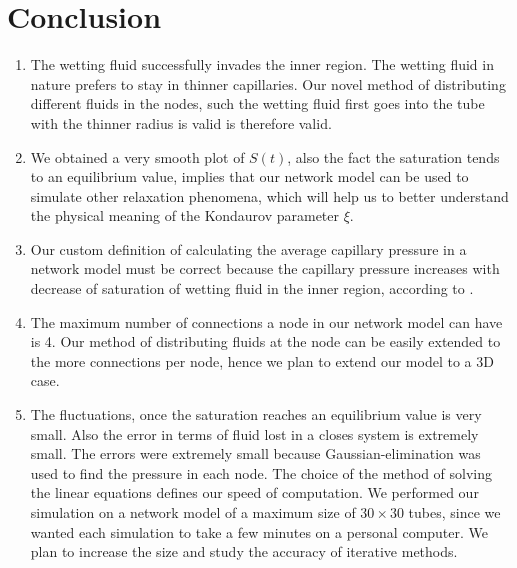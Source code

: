 \documentclass[
	12pt
] {article}
\begin{document}
\section{Conclusion}
	\begin{enumerate}
		\item The wetting fluid successfully invades the inner region. The wetting fluid in nature prefers to stay in thinner capillaries. Our novel method of distributing different fluids in the nodes, such the wetting fluid first goes into the tube with the thinner radius is valid is therefore valid.
		
		\item We obtained a very smooth plot of $S(t)$, also the fact the saturation tends to an equilibrium value, implies that our network model can be used to simulate other relaxation phenomena, which will help us to better understand the physical meaning of the Kondaurov parameter $\xi$.
		
		\item Our custom definition of calculating the average capillary pressure in a network model must be correct because the capillary pressure increases with decrease of saturation of wetting fluid in the inner region, according to \cite{fatt1956network}.
		
		\item The maximum number of connections a node in our network model can have is 4. Our method of distributing fluids at the node can be easily extended to the more connections per node, hence we plan to extend our model to a 3D case.
		
		\item The fluctuations, once the saturation reaches an equilibrium value is very small. Also the error in terms of fluid lost in a closes system is extremely small. The errors were extremely small because Gaussian-elimination was used to find the pressure in each node. The choice of the method of solving the linear equations defines our speed of computation. We performed our simulation on a network model of a maximum size of $30 \times 30$ tubes, since we wanted each simulation to take a few minutes on a personal computer. We plan to increase the size and study the accuracy of iterative methods.

	\end{enumerate}



\end{document}
